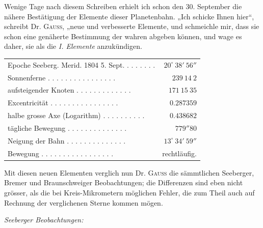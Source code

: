 Wenige Tage nach diesem Schreiben erhielt ich schon den 30. September die nähere
Bestätigung der Elemente dieser Planetenbahn. „Ich schicke Ihnen hier“, schreibt
Dr. \textsc{Gauss}, „neue und verbesserte Elemente, und schmeichle mir, dass sie schon eine
genäherte Bestimmung der wahren abgeben können, und wage es daher, sie als die
\textit{I. Elemente} anzukündigen.

\begin{center}
\begingroup\fontsize{9}{11}\selectfont\setlength{\tabcolsep}{3pt}
\begin{tabular}{lr}
Epoche Seeberg. Merid. 1804 5. Sept. . . . . . . . & $20^\circ\ 38'\ 56''$ \\
Sonnenferne . . . . . . . . . . . . . . . . & $239\ 14\ 2$ \\
aufsteigender Knoten . . . . . . . . . . . . . & $171\ 15\ 35$ \\
Excentricität . . . . . . . . . . . . . . . . & $0.287359$ \\
halbe grosse Axe (Logarithm) . . . . . . . . . . & $0.438682$ \\
tägliche Bewegung . . . . . . . . . . . . . . & $779''80$ \\
Neigung der Bahn . . . . . . . . . . . . . . & $13^\circ\ 34'\ 59''$ \\
Bewegung . . . . . . . . . . . . . . . . . & rechtläufig. \\
\end{tabular}\endgroup
\end{center}

Mit diesen neuen Elementen verglich nun Dr. \textsc{Gauss} die sämmtlichen Seeberger, Bremer
und Braunschweiger Beobachtungen; die Differenzen sind eben nicht grösser, als die
bei Kreis-Mikrometern möglichen Fehler, die zum Theil auch auf Rechnung der
verglichenen Sterne kommen mögen.

\begin{center}
\textit{Seeberger Beobachtungen:}
\end{center}

